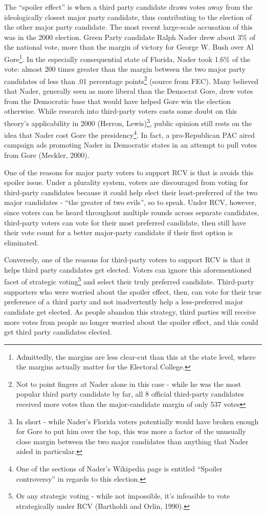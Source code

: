 \documentclass[12pt,twoside]{reedthesis}
\theoremstyle{definition}
\theoremstyle{definition}
\theoremstyle{definition}
\theoremstyle{remark}
\begin{document}
The ``spoiler effect'' is when a third party candidate draws votes away
from the ideologically closest major party candidate, thus contributing
to the election of the other major party candidate. The most recent
large-scale accusation of this was in the 2000 election. Green Party
candidate Ralph Nader drew about 3\% of the national vote, more than the
margin of victory for George W. Bush over Al Gore\footnote{Admittedly,
  the margins are less clear-cut than this at the state level, where the
  margins actually matter for the Electoral College.}. In the especially
consequential state of Florida, Nader took 1.6\% of the vote: almost 200
times greater than the margin between the two major party candidates of
less than .01 percentage points\footnote{Not to point fingers at Nader
  alone in this case - while he was the most popular third party
  candidate by far, all 8 official third-party candidates received more
  votes than the major-candidate margin of only 537 votes} (source from
FEC). Many believed that Nader, generally seen as more liberal than the
Democrat Gore, drew votes from the Democratic base that would have
helped Gore win the election otherwise. While research into third-party
voters casts some doubt on this theory's applicability in 2000 (Herron,
Lewis)\footnote{In short - while Nader's Florida voters potentially
  would have broken enough for Gore to put him over the top, this was
  more a factor of the unusually close margin between the two major
  candidates than anything that Nader aided in particular.}, public
opinion still rests on the idea that Nader cost Gore the
presidency\footnote{One of the sections of Nader's Wikipedia page is
  entitled ``Spoiler controversy'' in regards to this election.}. In
fact, a pro-Republican PAC aired campaign ads promoting Nader in
Democratic states in an attempt to pull votes from Gore (Meckler, 2000).

One of the reasons for major party voters to support RCV is that is
avoids this spoiler issue. Under a plurality system, voters are
discouraged from voting for third-party candidates because it could help
elect their least-preferred of the two major candidates - ``the greater
of two evils'', so to speak. Under RCV, however, since voters can be
heard throughout multiple rounds across separate candidates, third-party
voters can vote for their most preferred candidate, then still have
their vote count for a better major-party candidate if their first
option is eliminated.

Conversely, one of the reasons for third-party voters to support RCV is
that it helps third party candidates get elected. Voters can ignore this
aforementioned facet of strategic voting\footnote{Or any strategic
  voting - while not impossible, it's infeasible to vote strategically
  under RCV (Bartholdi and Orlin, 1990).} and select their truly
preferred candidate. Third-party supporters who were worried about the
spoiler effect, then, can vote for their true preference of a third
party and not inadvertently help a less-preferred major candidate get
elected. As people abandon this strategy, third parties will receive
more votes from people no longer worried about the spoiler effect, and
this could get third party candidates elected.
\end{document}

